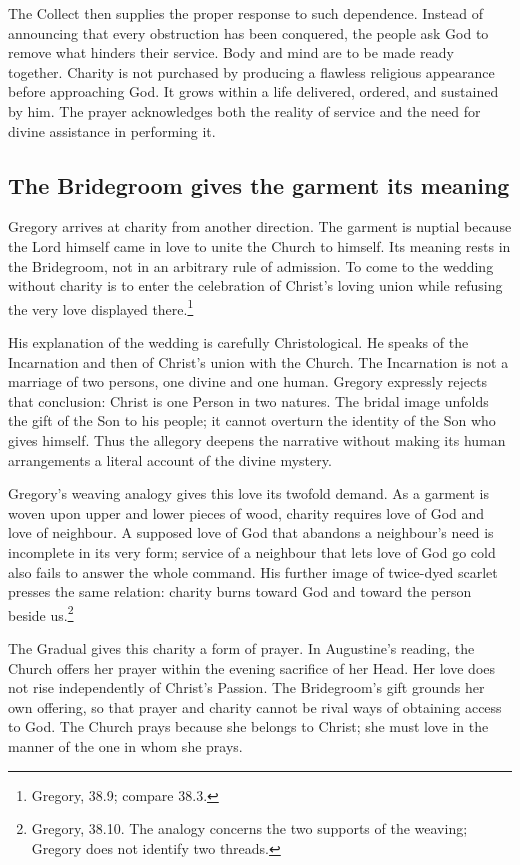 The Collect then supplies the proper response to such dependence.
Instead of announcing that every obstruction has been conquered,
the people ask God to remove what hinders their service. Body and
mind are to be made ready together. Charity is not purchased by
producing a flawless religious appearance before approaching God.
It grows within a life delivered, ordered, and sustained by him.
The prayer acknowledges both the reality of service and the need
for divine assistance in performing it.

\subsection{The Bridegroom gives the garment its meaning}

Gregory arrives at charity from another direction. The garment is
nuptial because the Lord himself came in love to unite the Church
to himself. Its meaning rests in the Bridegroom, not in an arbitrary
rule of admission. To come to the wedding without charity is to
enter the celebration of Christ's loving union while refusing the
very love displayed there.\footnote{Gregory, 
38.9; compare 38.3.}

His explanation of the wedding is carefully Christological. He
speaks of the Incarnation and then of Christ's union with the
Church. The Incarnation is not a marriage of two persons, one
divine and one human. Gregory expressly rejects that conclusion:
Christ is one Person in two natures. The bridal image unfolds the
gift of the Son to his people; it cannot overturn the identity of
the Son who gives himself. Thus the allegory deepens the narrative
without making its human arrangements a literal account of the
divine mystery.

Gregory's weaving analogy gives this love its twofold demand.
As a garment is woven upon upper and lower pieces of wood, charity
requires love of God and love of neighbour. A supposed love of God
that abandons a neighbour's need is incomplete in its very form;
service of a neighbour that lets love of God go cold also fails
to answer the whole command. His further image of twice-dyed
scarlet presses the same relation: charity burns toward God and
toward the person beside us.\footnote{Gregory, 
38.10. The analogy concerns the two supports of the weaving;
Gregory does not identify two threads.}

The Gradual gives this charity a form of prayer. In Augustine's
reading, the Church offers her prayer within the evening sacrifice
of her Head. Her love does not rise independently of Christ's
Passion. The Bridegroom's gift grounds her own offering, so that
prayer and charity cannot be rival ways of obtaining access to God.
The Church prays because she belongs to Christ; she must love in
the manner of the one in whom she prays.

